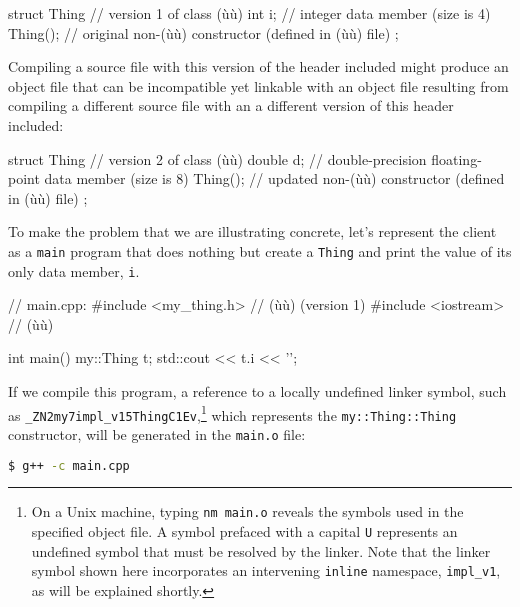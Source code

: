 \begin{emcppslisting}
struct Thing  // version 1 of class (ù{}ù)
{
    int i;    // integer data member (size is 4)
    Thing();  // original non-(ù{}ù) constructor (defined in (ù{}ù) file)
};
\end{emcppslisting}
    
\noindent Compiling a source file with this version of the header included might produce an object file that can be incompatible yet linkable with an object file resulting from compiling a different source file with an a different version of this header included:

\begin{emcppslisting}
struct Thing   // version 2 of class (ù{}ù)
{
    double d;  // double-precision floating-point data member (size is 8)
    Thing();   // updated non-(ù{}ù) constructor (defined in (ù{}ù) file)
};
\end{emcppslisting}
    
\noindent To make the problem that we are illustrating concrete, let's represent
the client as a \lstinline!main! program that does nothing but create a
\lstinline!Thing! and print the value of its only data member, \lstinline!i!.

\begin{emcppslisting}[emcppsbatch=e4]
// main.cpp:
#include <my_thing.h>  // (ù{}ù) (version 1)
#include <iostream>    // (ù{}ù)

int main()
{
     my::Thing t;
     std::cout << t.i << '\n';
}
\end{emcppslisting}
    
\noindent If we compile this program, a reference to a locally undefined linker
symbol, such as
\lstinline!_ZN2my7impl_v15ThingC1Ev!,{\cprotect\footnote{On a Unix
machine, typing \lstinline!nm!~\lstinline!main.o! reveals the symbols used
in the specified object file. A symbol prefaced with a capital
\lstinline!U! represents an undefined symbol that must be resolved by the
linker. Note that the linker symbol shown here incorporates an
intervening \lstinline!inline! namespace, \lstinline!impl_v1!, as will be
  explained shortly.}} which represents the \lstinline!my::Thing::Thing!
constructor, will be generated in the \lstinline!main.o! file:

\begin{lstlisting}[language=bash,style=plain]
$ g++ -c main.cpp
\end{lstlisting}
    
